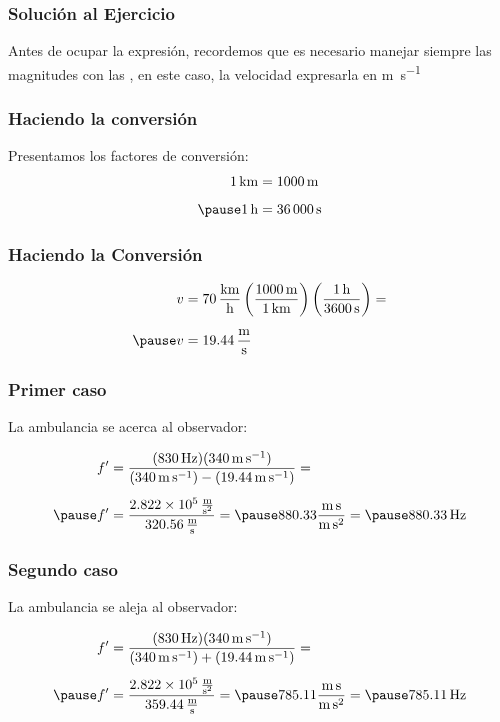 \documentclass[14pt]{beamer}
\begin{document}
\begin{frame}
\frametitle{Solución al Ejercicio}
Antes de ocupar la expresión, recordemos que es necesario manejar siempre las magnitudes con las , en este caso, la velocidad expresarla en \unit{\meter\per\second}
\end{frame}
\begin{frame}
\frametitle{Haciendo la conversión}
Presentamos los factores de conversión:
\pause
\begin{eqnarray*}
\begin{aligned}
\SI{1}{\kilo\meter} &= \SI{1000}{\meter} \\[0.5em] \pause
\SI{1}{\hour} &= \SI{36000}{\second}
\end{aligned}
\end{eqnarray*}
\end{frame}
\begin{frame}
\frametitle{Haciendo la Conversión}
\begin{eqnarray*}
\begin{aligned}
v &= \SI[per-mode=fraction]{70}{\kilo\meter\per\hour} \left( \dfrac{\SI{1000}{\meter}}{\SI{1}{\kilo\meter}} \right) \left( \dfrac{\SI{1}{\hour}}{\SI{3600}{\second}} \right) = \\[0.5em] \pause
v &= \SI[per-mode=fraction]{19.44}{\meter\per\second}
\end{aligned}
\end{eqnarray*}
\end{frame}
\begin{frame}
\frametitle{Primer caso}
La ambulancia se acerca al observador:

\pause
\begin{eqnarray*}
\begin{aligned}
\pderivada{f} &= \dfrac{(\SI{830}{\hertz})(\SI{340}{\meter\per\second})}{(\SI{340}{\meter\per\second}) - (\SI{19.44}{\meter\per\second})} = \\[0.5em] \pause
\pderivada{f} &= \dfrac{\SI[per-mode=fraction]{2.822d5}{\meter\per\square\second}}{\SI[per-mode=fraction]{320.56}{\meter\per\second}} = \pause \num{880.33} \dfrac{\unit{\meter\second}}{\unit{\meter\square\second}} = \pause \SI{880.33}{\hertz}
\end{aligned}
\end{eqnarray*}
\end{frame}
\begin{frame}
\frametitle{Segundo caso}
La ambulancia se aleja al observador:

\pause
\begin{eqnarray*}
\begin{aligned}
\pderivada{f} &= \dfrac{(\SI{830}{\hertz})(\SI{340}{\meter\per\second})}{(\SI{340}{\meter\per\second}) + (\SI{19.44}{\meter\per\second})} = \\[0.5em] \pause
\pderivada{f} &= \dfrac{\SI[per-mode=fraction]{2.822d5}{\meter\per\square\second}}{\SI[per-mode=fraction]{359.44}{\meter\per\second}} = \pause \num{785.11} \dfrac{\unit{\meter\second}}{\unit{\meter\square\second}} = \pause \SI{785.11}{\hertz}
\end{aligned}
\end{eqnarray*}
\end{frame}
\end{document}
